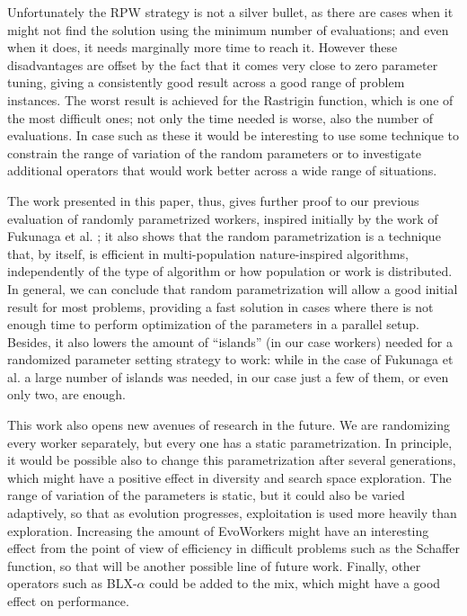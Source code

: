 \documentclass[conference]{IEEEtran}
\begin{document}
Unfortunately the RPW strategy is not a silver bullet, as there are cases
when it might not find the solution using the minimum number of
evaluations; and even when it does, it needs marginally more time to
reach it. However these disadvantages are
offset by the fact that it comes very close to zero parameter tuning,
giving a consistently good result across a good range of problem instances.
The worst result is achieved for the Rastrigin function, which
is one of the most difficult ones; not only the time needed is worse,
also the number of evaluations. In case such as these it would be
interesting to use some technique to constrain the range of variation
of the random parameters or to investigate additional operators that
would work better across a wide range of situations.

The work presented in this paper, thus, gives further proof to our
previous evaluation of randomly parametrized workers, inspired
initially by the work of Fukunaga et al. \cite{fuku1}; it also shows that the random
parametrization is a technique that, by itself, is efficient in
multi-population nature-inspired algorithms, independently of the type
of algorithm or how population or work is distributed. In general, we
can conclude that 
random parametrization will allow a good initial result for most
problems, providing a fast solution in cases where there is not enough
time to perform optimization of the parameters in a parallel
setup. Besides, it also lowers the amount of ``islands'' (in our case
workers) needed for a randomized parameter setting strategy to work:
while in the case of Fukunaga et al. \cite{fuku1} a large number of islands was
needed, in our case just a few of them, or even only two, are
enough.

This work also opens new avenues of research in the future. We are
randomizing every worker separately, but every one has a static
parametrization. In principle, it would be possible also to change
this parametrization after several generations, which might have a
positive effect in diversity and search space exploration. The range
of variation of the parameters is static, but it could also be varied
adaptively, so that as evolution progresses, exploitation is used more
heavily than exploration. Increasing the amount of EvoWorkers might
have an interesting effect from the point of view of efficiency in
difficult problems such as the Schaffer function, so that will be
another possible line of future work.
Finally, other operators such as
BLX-$\alpha$ could be added to the mix, which might have a good effect
on performance.
\end{document}
